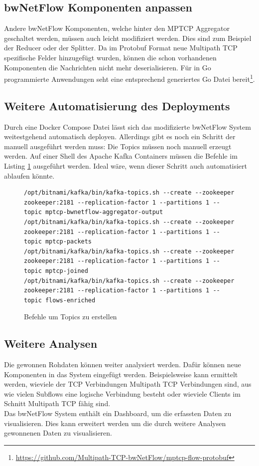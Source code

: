 \documentclass[a4paper, 12pt]{article}
\begin{document}
\subsection{bwNetFlow Komponenten anpassen}

Andere bwNetFlow Komponenten, welche hinter den MPTCP Aggregator geschaltet werden, müssen auch leicht modifiziert werden.
Dies sind zum Beispiel der Reducer oder der Splitter.
Da im Protobuf Format neue Multipath TCP spezifische Felder hinzugefügt wurden, 
können die schon vorhandenen Komponenten die Nachrichten nicht mehr deserialisieren.
Für in Go programmierte Anwendungen seht eine entsprechend generiertes Go Datei bereit\footnote{\url{https://github.com/Multipath-TCP-bwNetFlow/mptcp-flow-protobuf}}.

\subsection{Weitere Automatisierung des Deployments}
Durch eine Docker Compose Datei lässt sich das modifizierte bwNetFlow System weitestgehend automatisch deployen.
Allerdings gibt es noch ein Schritt der manuell ausgeführt werden muss:
Die Topics müssen noch manuell erzeugt werden.
Auf einer Shell des Apache Kafka Containers müssen die Befehle im Listing \ref{listing:topics} ausgeführt werden.
Ideal wäre, wenn dieser Schritt auch automatisiert ablaufen könnte.

\begin{figure}[H]
\begin{lstlisting}
/opt/bitnami/kafka/bin/kafka-topics.sh --create --zookeeper zookeeper:2181 --replication-factor 1 --partitions 1 --topic mptcp-bwnetflow-aggregator-output
/opt/bitnami/kafka/bin/kafka-topics.sh --create --zookeeper zookeeper:2181 --replication-factor 1 --partitions 1 --topic mptcp-packets
/opt/bitnami/kafka/bin/kafka-topics.sh --create --zookeeper zookeeper:2181 --replication-factor 1 --partitions 1 --topic mptcp-joined
/opt/bitnami/kafka/bin/kafka-topics.sh --create --zookeeper zookeeper:2181 --replication-factor 1 --partitions 1 --topic flows-enriched
\end{lstlisting}
\caption{Befehle um Topics zu erstellen}
\label{listing:topics}
\end{figure}

\subsection{Weitere Analysen}
Die gewonnen Rohdaten können weiter analysiert werden.
Dafür können neue Komponenten in das System eingefügt werden.
Beispielsweise kann ermittelt werden, wieviele der TCP Verbindungen Multipath TCP Verbindungen sind,
aus wie vielen Subflows eine logische Verbindung besteht oder wieviele Clients im Schnitt Multipath TCP fähig sind.
\\
Das bwNetFlow System enthält ein Dashboard, um die erfassten Daten zu visualisieren.
Dies kann erweitert werden um die durch weitere Analysen gewonnenen Daten zu visualisieren.
\end{document}
